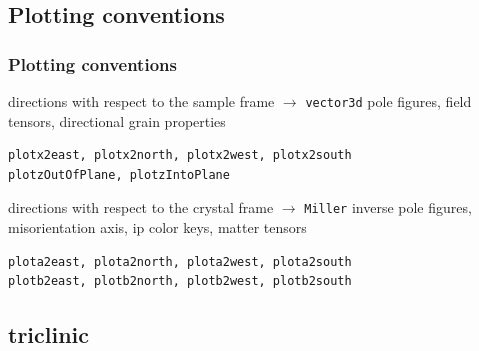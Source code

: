 \documentclass[compress]{beamer}
\begin{document}
\subsection*{Plotting conventions}

\begin{frame}[fragile]
  \frametitle{Plotting conventions}


  \begin{beamerboxesrounded}{directions with respect to the sample frame $\rightarrow$ \texttt{vector3d}}
    pole figures, field tensors, directional grain properties
  \end{beamerboxesrounded}

  \begin{lstlisting}[style=input]
plotx2east, plotx2north, plotx2west, plotx2south
plotzOutOfPlane, plotzIntoPlane
  \end{lstlisting}

  \pause

  \bigskip

  \begin{beamerboxesrounded}{directions with respect to the crystal frame $\rightarrow$ \texttt{Miller}}
    inverse pole figures, misorientation axis, ip color keys, matter tensors
  \end{beamerboxesrounded}

    \begin{lstlisting}[style=input]
plota2east, plota2north, plota2west, plota2south
plotb2east, plotb2north, plotb2west, plotb2south
  \end{lstlisting}

\end{frame}


\subsection*{triclinic}
\label{sec:crystal-symmetries}
\end{document}
